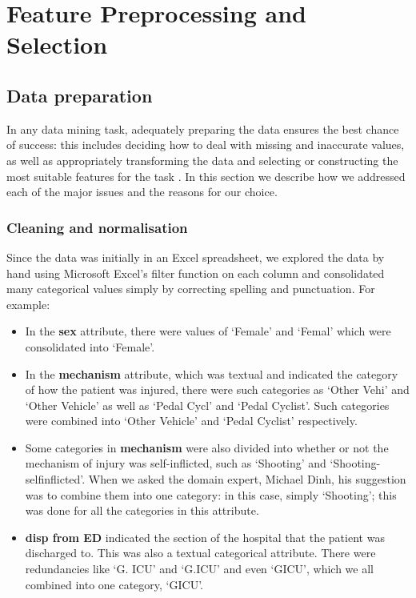 \chapter{Feature Preprocessing and Selection} \label{chap:features}

\section{Data preparation}
In any data mining task, adequately preparing the data ensures the best
chance of success: this includes deciding how to deal with missing and
inaccurate values, as well as appropriately transforming the data
\citep{Witten2005} and selecting or constructing the most suitable features
for the task \citep{Kotsiantis2006}.
In this section we describe how we addressed each of
the major issues and the reasons for our choice.

\subsection{Cleaning and normalisation} %
Since the data was initially in an Excel spreadsheet, we explored the data
by hand using Microsoft Excel's filter function on each column and
consolidated many categorical values simply
by correcting spelling and punctuation. For example:
\begin{itemize}
  \item In the \textbf{sex} attribute, there were values of `Female' and
  `Femal' which were consolidated into `Female'.
  \item In the \textbf{mechanism} attribute, which was textual and indicated
  the category of how the patient was injured, there were such categories as
  `Other Vehi' and `Other Vehicle' as well as `Pedal Cycl' and `Pedal Cyclist'.
  Such categories were combined into `Other Vehicle' and `Pedal Cyclist'
  respectively.
  \item Some categories in \textbf{mechanism} were also divided into whether or
  not the mechanism of injury was self-inflicted, such as `Shooting' and
  `Shooting-selfinflicted'. When we asked the domain expert, Michael Dinh, his
  suggestion was to combine them into one category: in this case, simply
  `Shooting'; this was done for all the categories in this attribute.
  \item \textbf{disp from ED} indicated the section of the hospital that the
  patient was discharged to. This was also a textual categorical attribute.
  There were redundancies like `G. ICU' and `G.ICU' and even `GICU', which we
  all combined into one category, `GICU'.
\end{itemize}

